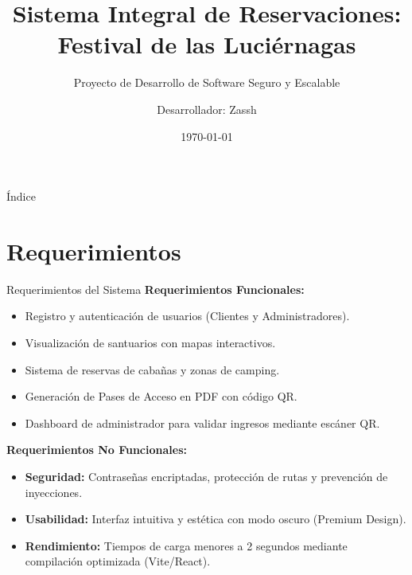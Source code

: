 \documentclass{beamer}
\title[Festival de las Luciérnagas]{Sistema Integral de Reservaciones: Festival de las Luciérnagas}
\subtitle{Proyecto de Desarrollo de Software Seguro y Escalable}
\author[Zassh]{Desarrollador: Zassh}
\institute[Desarrollo Independiente]{Proyecto de Desarrollo Independiente}
\date{\today}
\begin{document}
\begin{frame}
  \titlepage
\end{frame}

\begin{frame}{Índice}
  \tableofcontents
\end{frame}

\section{Requerimientos}
\begin{frame}{Requerimientos del Sistema}
  \textbf{Requerimientos Funcionales:}
  \begin{itemize}
      \item Registro y autenticación de usuarios (Clientes y Administradores).
      \item Visualización de santuarios con mapas interactivos.
      \item Sistema de reservas de cabañas y zonas de camping.
      \item Generación de Pases de Acceso en PDF con código QR.
      \item Dashboard de administrador para validar ingresos mediante escáner QR.
  \end{itemize}
  \vspace{0.3cm}
  \textbf{Requerimientos No Funcionales:}
  \begin{itemize}
      \item \textbf{Seguridad:} Contraseñas encriptadas, protección de rutas y prevención de inyecciones.
      \item \textbf{Usabilidad:} Interfaz intuitiva y estética con modo oscuro (Premium Design).
      \item \textbf{Rendimiento:} Tiempos de carga menores a 2 segundos mediante compilación optimizada (Vite/React).
  \end{itemize}
\end{frame}

\end{document}
